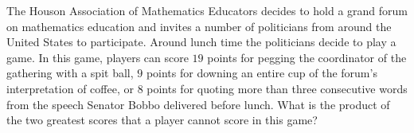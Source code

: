 The Houson Association of Mathematics Educators decides to hold a grand forum on mathematics education and invites a number of politicians from around the United States to participate. Around lunch time the politicians decide to play a game. In this game, players can score $19$ points for pegging the coordinator of the gathering with a spit ball, $9$ points for downing an entire cup of the forum’s interpretation of coffee, or $8$ points for quoting more than three consecutive words from the speech Senator Bobbo delivered before lunch. What is the product of the two greatest scores that a player cannot score in this game?